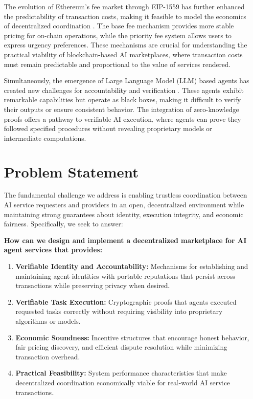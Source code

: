 The evolution of Ethereum's fee market through EIP-1559 has further enhanced the predictability of transaction costs, making it feasible to model the economics of decentralized coordination \citep{roughgarden2021eip1559}. The base fee mechanism provides more stable pricing for on-chain operations, while the priority fee system allows users to express urgency preferences. These mechanisms are crucial for understanding the practical viability of blockchain-based AI marketplaces, where transaction costs must remain predictable and proportional to the value of services rendered.

Simultaneously, the emergence of Large Language Model (LLM) based agents has created new challenges for accountability and verification \citep{wang2023llmagents}. These agents exhibit remarkable capabilities but operate as black boxes, making it difficult to verify their outputs or ensure consistent behavior. The integration of zero-knowledge proofs offers a pathway to verifiable AI execution, where agents can prove they followed specified procedures without revealing proprietary models or intermediate computations.

\section{Problem Statement}

The fundamental challenge we address is enabling trustless coordination between AI service requesters and providers in an open, decentralized environment while maintaining strong guarantees about identity, execution integrity, and economic fairness. Specifically, we seek to answer:

\textbf{How can we design and implement a decentralized marketplace for AI agent services that provides:}
\begin{enumerate}
    \item \textbf{Verifiable Identity and Accountability:} Mechanisms for establishing and maintaining agent identities with portable reputations that persist across transactions while preserving privacy when desired.
    \item \textbf{Verifiable Task Execution:} Cryptographic proofs that agents executed requested tasks correctly without requiring visibility into proprietary algorithms or models.
    \item \textbf{Economic Soundness:} Incentive structures that encourage honest behavior, fair pricing discovery, and efficient dispute resolution while minimizing transaction overhead.
    \item \textbf{Practical Feasibility:} System performance characteristics that make decentralized coordination economically viable for real-world AI service transactions.
\end{enumerate}

